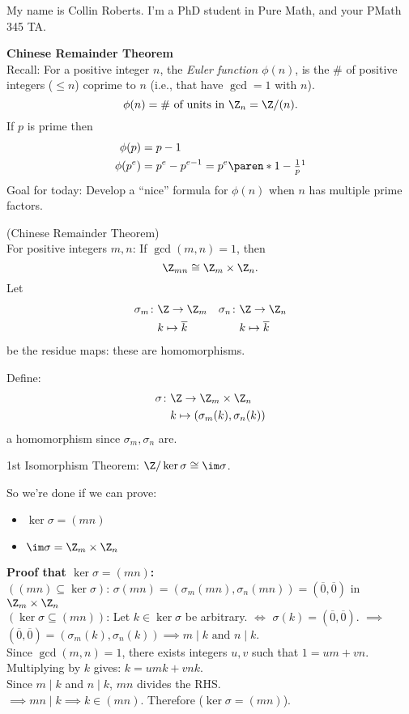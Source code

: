 My name is Collin Roberts.  I'm a PhD student in Pure Math, and your PMath 345 TA.

\textbf{Chinese Remainder Theorem} \\
Recall: For a positive integer $n$, the \emph{Euler function $\phi(n)$}, is the \# of positive integers ($\leq n$) coprime to $n$ (i.e., that have $\gcd=1$ with $n$).
\[ \phi(n) = \text{\# of units in $\Z_n=\Z/(n)$} . \]
If $p$ is prime then
\begin{align*}
\phi(p) &= p-1 \\
\phi(p^e) &= p^e - p^{e-1} = p^e\paren*{1-\tfrac1p}\footnotemark
\end{align*}
%
Goal for today: Develop a ``nice'' formula for $\phi(n)$ when $n$ has multiple prime factors.

\prop (Chinese Remainder Theorem) \\
For positive integers $m,n$: If $\gcd(m,n)=1$, then
\[ \Z_{mn} \cong \Z_m \times \Z_n . \]
\pf Let
\begin{align*}
\sigma_m\colon &\Z \to \Z_m & \sigma_n\colon & \Z \to \Z_n \\
& k \mapsto \overline k & & k \mapsto \overline k
\end{align*}
be the residue maps: these are homomorphisms.

Define:
\begin{align*}
\sigma\colon & \Z \to \Z_m \times \Z_n \\
& k \mapsto (\sigma_m(k),\sigma_n(k))
\end{align*}
a homomorphism since $\sigma_m,\sigma_n$ are.

1st Isomorphism Theorem: $\Z/\ker\sigma\cong\im\sigma$.

So we're done if we can prove:
\begin{itemize}
\item $\ker\sigma = (mn)$
\item $\im\sigma = \Z_m \times \Z_n$
\end{itemize}
\textbf{Proof that $\ker\sigma=(mn)$:} \\
$((mn)\subseteq\ker\sigma)$: $\sigma(mn)=(\sigma_m(mn),\sigma_n(mn))=(\overline0,\overline0)$ in $\Z_m\times\Z_n$ \\
$(\ker\sigma\subseteq(mn))$: Let $k\in\ker\sigma$ be arbitrary. $\iff$ $\sigma(k)=(\overline0,\overline0)$. $\implies$ $(\overline0,\overline0)=(\sigma_m(k),\sigma_n(k))\implies m\mid k\text{ and }n\mid k$. \\
Since $\gcd(m,n)=1$, there exists integers $u,v$ such that $1=um+vn$. \\
Multiplying by $k$ gives: $k=umk+vnk$. \\
Since $m\mid k$ and $n\mid k$, $mn$ divides the RHS. \\
$\implies mn\mid k\implies k\in(mn)$. Therefore ($\ker\sigma=(mn)$).

